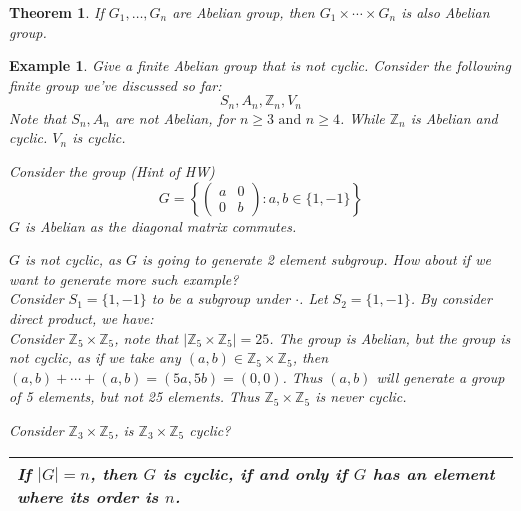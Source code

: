 \documentclass{article}
\theoremstyle{MyNonumberplain}
\theoremstyle{break}
\newcommand{\infixand}{\text{ and }}
\theoremstyle{break}
\newtheorem{theorem}{Theorem}[section]
\newtheorem{example}{Example}[section]
\theoremstyle{break}
\theoremstyle{definition}
\theoremstyle{break}
\begin{document}
\begin{thmbox}
    \begin{theorem}
        If $G_1, \ldots, G_n$ are Abelian group, then $G_1 \times \cdots \times G_n$
        is also Abelian group. 
    \end{theorem}

\end{thmbox}


\begin{expbox}
    \begin{example}
        Give a finite Abelian group that is not cyclic.
        Consider the following finite group we've discussed so far:
        \[ S_n, A_n, \mathbb{Z}_n, V_n \]
        Note that $S_n, A_n$ are not Abelian, for $n \geq 3 \infixand n \geq 4$. While
        $\mathbb{Z}_n$ is Abelian and cyclic. $V_n$ is cyclic.\bigskip

        Consider the group (Hint of HW)
        \[ G = \left\{ \left(\begin{array}{cc}
            a & 0\\
            0 & b
        \end{array}\right) : a, b \in \{ 1, - 1 \} \right\} \]
        $G$ is Abelian as the diagonal matrix commutes.\bigskip

        $G$ is not cyclic, as $G$ is going to generate 2 element subgroup. How about
        if we want to generate more such example?\\

        Consider $S_1 = \{ 1, - 1 \}$ to be a subgroup under $\cdot$. Let $S_2 = \{ 1,
        - 1 \}$. By consider direct product, we have:\\

        Consider $\mathbb{Z}_5 \times \mathbb{Z}_5$, note that $| \mathbb{Z}_5 \times
        \mathbb{Z}_5 | = 25$. The group is Abelian, but the group is not cyclic, as if
        we take any $(a, b) \in \mathbb{Z}_5 \times \mathbb{Z}_5$, then $(a, b) +
        \cdots + (a, b) = (5 a, 5 b) = (0, 0)$. Thus $(a, b)$ will generate a group of
        5 elements, but not 25 elements. Thus $\mathbb{Z}_5 \times \mathbb{Z}_5$ is
        never cyclic.\bigskip

        Consider $\mathbb{Z}_3 \times \mathbb{Z}_5$, is $\mathbb{Z}_3 \times
        \mathbb{Z}_5$ cyclic?\\

        {\noindent}\begin{tabularx}{1.0\textwidth}{|@{}X@{}|}
        \hline
        If $| G | = n$, then $G$ is cyclic, if and only if $G$ has an element where
        its order is $n$.\\
        \hline
        \end{tabularx}\\


\end{example}
\end{expbox}
\end{document}
